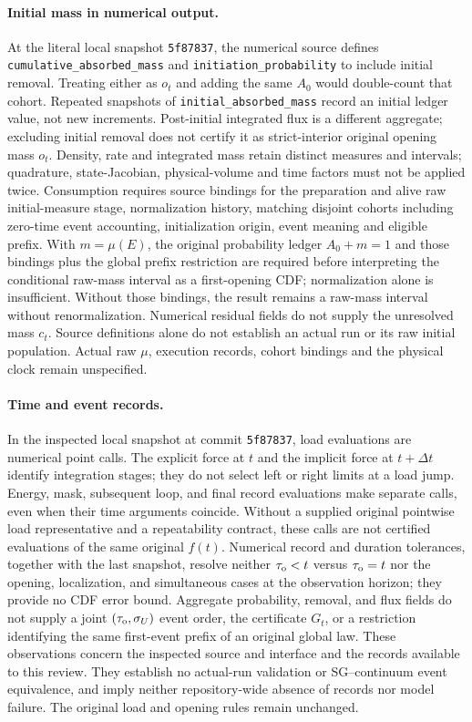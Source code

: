 \documentclass[11pt]{article}
\begin{document}
\paragraph{Initial mass in numerical output.}
At the literal local snapshot \texttt{5f87837}, the numerical source defines
\texttt{cumulative\_\allowbreak absorbed\_\allowbreak mass} and
\texttt{initiation\_\allowbreak probability} to include initial removal.
Treating either as $o_t$ and adding the same $A_0$ would double-count that cohort.
Repeated snapshots of \texttt{initial\_\allowbreak absorbed\_\allowbreak mass}
record an initial ledger value, not new increments.
Post-initial integrated flux is a different aggregate; excluding initial
removal does not certify it as strict-interior original opening mass $o_t$.
Density, rate and integrated mass retain distinct measures and intervals;
quadrature, state-Jacobian, physical-volume and time factors must not be applied twice.
Consumption requires source bindings for the preparation and alive raw
initial-measure stage, normalization history, matching disjoint cohorts
including zero-time event accounting,
initialization origin, event meaning and eligible prefix.
With $m=\mu(E)$, the original probability ledger $A_0+m=1$ and those
bindings plus the global prefix restriction are required before interpreting
the conditional raw-mass interval as a first-opening CDF;
normalization alone is insufficient.
Without those bindings, the result remains a raw-mass interval without renormalization.
Numerical residual fields do not supply the unresolved mass $c_t$.
Source definitions alone do not establish an actual run or its raw initial population.
Actual raw $\mu$, execution records, cohort bindings and the physical clock remain unspecified.

\paragraph{Time and event records.}
In the inspected local snapshot at commit \texttt{5f87837}, load evaluations are numerical point calls. The explicit force at \(t\) and the implicit force at \(t+\Delta t\) identify integration stages; they do not select left or right limits at a load jump. Energy, mask, subsequent loop, and final record evaluations make separate calls, even when their time arguments coincide. Without a supplied original pointwise load representative and a repeatability contract, these calls are not certified evaluations of the same original \(f(t)\). Numerical record and duration tolerances, together with the last snapshot, resolve neither \(\tau_{\rm o}<t\) versus \(\tau_{\rm o}=t\) nor the opening, localization, and simultaneous cases at the observation horizon; they provide no CDF error bound. Aggregate probability, removal, and flux fields do not supply a joint \((\tau_{\rm o},\sigma_U)\) event order, the certificate \(G_t\), or a restriction identifying the same first-event prefix of an original global law. These observations concern the inspected source and interface and the records available to this review. They establish no actual-run validation or SG--continuum event equivalence, and imply neither repository-wide absence of records nor model failure. The original load and opening rules remain unchanged.
\end{document}
